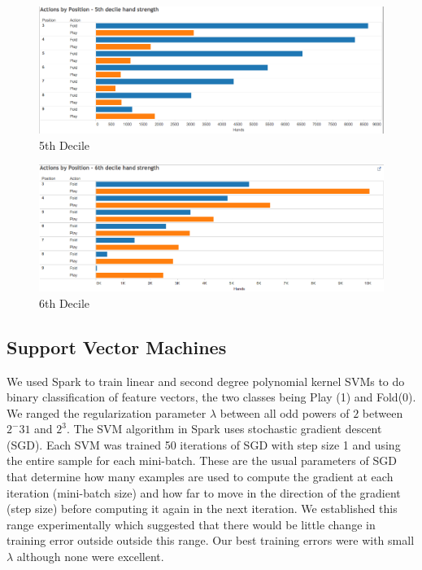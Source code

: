 \documentclass[twoside]{article}
\begin{document}
\begin{multicols}{2}
\begin{figure}[H]
  \centering
  \centerline{\includegraphics[width=1.1\columnwidth]{5thDecile.png}}
   \caption{5th Decile}
  \label{fig:5thDecile}
\end{figure}

\begin{figure}[H]
  \centering
  \centerline{\includegraphics[width=1.1\columnwidth]{6thDecile.png}}
   \caption{6th Decile}
  \label{fig:6thDecile}
\end{figure}

\subsection{Support Vector Machines}

We used Spark to train linear and second degree polynomial kernel SVMs to do binary classification of feature vectors, the two classes being Play (1) and Fold(0). We ranged the regularization parameter $\lambda$ between all odd powers of $2$ between $2^-31$ and $2^3$. The SVM algorithm in Spark uses stochastic gradient descent (SGD). Each SVM was trained 50 iterations of SGD with step size 1 and using the entire sample for each mini-batch. These are the usual parameters of SGD that determine how many examples are used to compute the gradient at each iteration (mini-batch size) and how far to move in the direction of the gradient (step size) before computing it again in the next iteration. We established this range experimentally which suggested that there would be little change in training error outside outside this range. Our best training errors were with small $\lambda$ although none were excellent.


\end{multicols}
\end{document}
